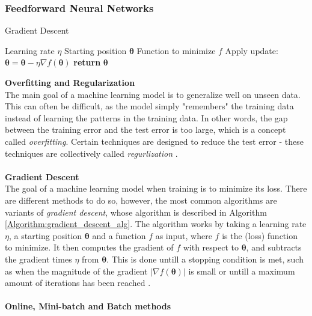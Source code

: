 \documentclass[./main.tex]{subfiles}
\begin{document}
\subsubsection{Feedforward Neural Networks} \label{subsubsec:FeedforwardNN}
\begin{algorithm}[htbp]
    \caption{Gradient Descent \cite{d2l}}
    \label{Algorithm:gradient_descent_alg}
    \begin{algorithmic}[1]
        \Require Learning rate $\eta$
        \Require Starting position $\bm{\theta}$
        \Require Function to minimize $f$
            \State Apply update: $\bm{\theta} = \bm{\theta} - \eta \nabla f(\bm{\theta})$
        \EndWhile
        \State \textbf{return} $\bm{\theta}$
    \end{algorithmic}
\end{algorithm}
\noindent \textbf{Overfitting and Regularization} \\
The main goal of a machine learning model is to generalize well on unseen data. This can often be difficult, as the model simply "remembers" the training data instead of learning the patterns in the training data. In other words, the gap between the training error and the test error is too large, which is a concept called \textit{overfitting}. Certain techniques are designed to reduce the test error - these techniques are collectively called \textit{regurlization} \cite{DeepLearning}. 
\\
\\
\textbf{Gradient Descent} \\
The goal of a machine learning model when training is to minimize its loss. There are different methods to do so, however, the most common algorithms are variants of \textit{gradient descent}, whose algorithm is described in Algorithm \ref{Algorithm:gradient_descent_alg}. The algorithm works by taking a learning rate $\eta$, a starting position $\bm{\theta}$ and a function $f$ as input, where $f$ is the (loss) function to minimize. It then computes the gradient of $f$ with respect to $\bm{\theta}$, and subtracts the gradient times $\eta$ from $\bm{\theta}$. This is done untill a stopping condition is met, such as when the magnitude of the gradient $\left| \nabla f(\bm{\theta}) \right|$ is small or untill a maximum amount of iterations has been reached \cite{d2l}.
\\
\\
\noindent \textbf{Online, Mini-batch and Batch methods} \\
\end{document}
